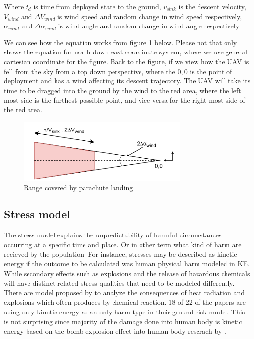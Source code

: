 \documentclass[12pt]{report}
\begin{document}
            Where \(t_d\) is time from deployed state to the ground, \(v_{sink}\) is the descent velocity,
            \(V_{wind}\) and \(\Delta V_{wind}\) is wind speed and random change in wind speed respectively,
            \(\alpha_{wind}\) and \(\Delta \alpha_{wind}\) is wind angle and random change in wind angle respectively

            We can see how the equation works from figure \ref{fig:area_parachute} below. Please not that
            \cite{bleier_risk_2015} only shows the equation for north down east coordinate system, where we use general
            cartesian coordinate for the figure. Back to the figure, if we view how the UAV is fell from the sky from a
            top down perspective, where the \(0,0\) is the point of deployment and has a wind affecting its descent
            trajectory. The UAV will take its time to be dragged into the ground by the wind to the red area, where the
            left most side is the furthest possible point, and vice versa for the right most side of the red area. 

            \begin{figure}[H]
                \centering
                \includegraphics[width=0.75\textwidth]{General Image/OSM Drone-Landing zone.pdf}
                \caption{Range covered by parachute landing}
                \label{fig:area_parachute}
            \end{figure}

        \subsection{Stress model}
                The stress model explains the unpredictability of harmful circumstances occurring at a specific time and
            place. Or in other term what kind of harm are recieved by the population. For instance, stresses may be
            described as kinetic energy if the outcome to be calculated was human physical harm modeled in \ac{KE}.
            While secondary effects such as explosions and the release of hazardous chemicals will have distinct related
            stress qualities that need to be modeled differently. There are model proposed by \cite{ball_crash_2012} to
            analyze the consequences of heat radiation and explosions which often produces by chemical reaction. 18 of
            22 of the papers are using only kinetic energy as an only harm type in their ground risk model. This is not
            surprising since majority of the damage done into human body is kinetic energy based on the bomb explosion
            effect into human body reserach by \cite{harwick_approved_2007}.
\end{document}
